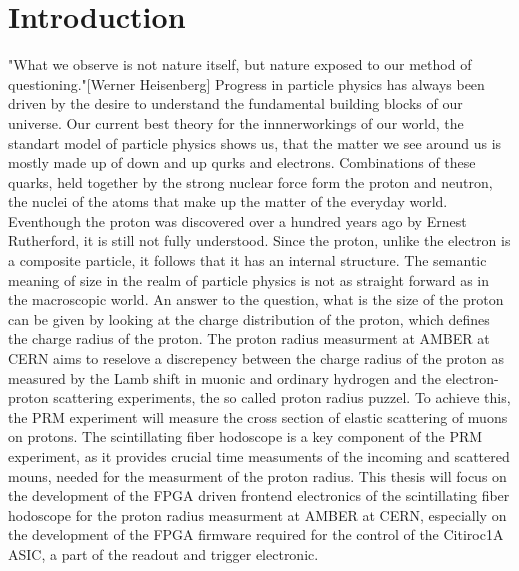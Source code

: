 \chapter{Introduction} \label{chap:introduction}
"What we observe is not nature itself, but nature exposed to our method of questioning."[Werner Heisenberg] \autocite{Heisenberg1958}
\newline
Progress in particle physics has always been driven by the desire to understand the fundamental building blocks of our universe.
\newline Our current best theory for the innnerworkings of our world,
the standart model of particle physics shows us, that the matter we see around us is mostly made up of down and up qurks and electrons.
Combinations of these quarks, held together by the strong nuclear force form the proton and neutron, the nuclei of the atoms that make up the matter of the everyday world.
Eventhough the proton was discovered over a hundred years ago by Ernest Rutherford\autocite{discoveryProton}, it is still not fully understood.
\newline
Since the proton, unlike the electron is a composite particle, it follows that it has an internal structure.
The semantic meaning of size in the realm of particle  physics is not as straight forward as in the macroscopic world. An answer to the question,
what is the size of the proton can be given 
by looking at the charge distribution of the proton, which defines the charge radius of the proton.
\newline
The proton radius measurment at AMBER at CERN aims to reselove a discrepency between the charge radius of the proton as measured by the Lamb shift in muonic and ordinary hydrogen and the electron-proton scattering experiments,
the so called proton radius puzzel.
\newline
To achieve this, the PRM experiment will measure the cross section of elastic scattering of muons on protons.
The scintillating fiber hodoscope is a key component of the PRM experiment, as it provides crucial time measuments of the incoming and scattered mouns, needed for the measurment of the proton radius\Autocite{ProposalAmber}.
\newline
This thesis will focus on the development of the FPGA driven frontend electronics of the scintillating fiber hodoscope 
for the proton radius measurment at AMBER at CERN,
especially on the development of the FPGA firmware required for the control of the Citiroc1A ASIC, a part of the readout and trigger electronic. 


 
